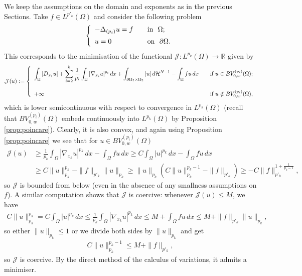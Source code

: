 \documentclass[reqno,12pt]{amsart}
\numberwithin{equation}{section}
\begin{document}
We keep the assumptions on the domain and exponents as in the previous Sections. Take $f \in L^{p'_k}(\Omega)$ and consider the following problem
\begin{equation}\label{eq:ellipticproblem}
\left\{ \begin{array}{lll} -\Delta_{(p_i)} u = f   \quad &\hbox{in} \ \ \Omega; \\[5pt] u = 0 \quad &\hbox{on} \ \ \partial\Omega.
\end{array} \right.
\end{equation}
This corresponds to the minimisation of the functional $\mathcal{J}: L^{p_k}(\Omega) \rightarrow \mathbb{R}$ given by
\begin{equation}
\mathcal{J}(u):= \left\{ \begin{array}{ll} \displaystyle 
\int_{\Omega} |D_{x_1} u| + \sum_{i=2}^k \frac{1}{p_i} \int_{\Omega} |\nabla_{x_i} u|^{p_i} \, dx + \int_{\partial\Omega_1 \times \Omega_2} |u| \, d\mathcal{H}^{N-1} - \int_{\Omega} fu \, dx \quad &\hbox{if} \ u \in BV_{0,w}^{(p_i)}(\Omega); \\ \\ + \infty \quad &\hbox{if} \ u \notin  BV_{0,w}^{(p_i)}(\Omega),
\end{array}\right.
\end{equation}
which is lower semicontinuous with respect to convergence in $L^{p_k}(\Omega)$ (recall that $BV_{0,w}^{(p_i)}(\Omega)$ embeds continuously into $L^{p_k}(\Omega)$ by Proposition \ref{prop:poincare}). Clearly, it is also convex, and again using Proposition \ref{prop:poincare} we see that for $u \in BV_{0,w}^{(p_i)}(\Omega)$
\begin{align}
\mathcal{J}(u) &\geq \frac{1}{p_k} \int_{\Omega} |\nabla_{x_k} u|^{p_k} \, dx - \int_{\Omega} fu \, dx \geq C \int_{\Omega} |u|^{p_k} \, dx - \int_{\Omega} fu \, dx \\
&\geq C \| u \|_{p_k}^{p_k} - \| f \|_{p'_k} \| u \|_{p_k} \geq \| u \|_{p_k} (C \| u \|_{p_k}^{p_k - 1} - \| f \|_{p'_k}) \geq - C \| f \|_{p'_k}^{1 + \frac{1}{p_k - 1}},
\end{align}
so $\mathcal{J}$ is bounded from below (even in the absence of any smallness assumptions on $f$). A similar computation shows that $\mathcal{J}$ is coercive: whenever $\mathcal{J}(u) \leq M$, we have
\begin{align}
C \| u \|_{p_k}^{p_k} = C \int_{\Omega} |u|^{p_k} \, dx \leq \frac{1}{p_k} \int_{\Omega} |\nabla_{x_k} u|^{p_k} \, dx \leq M + \int_{\Omega} fu \, dx \leq M + \| f \|_{p'_k} \| u \|_{p_k},
\end{align}
so either $\| u \|_{p_k} \leq 1$ or we divide both sides by $\| u \|_{p_k}$ and get
\begin{align}
C \| u \|_{p_k}^{p_k - 1} \leq M + \| f \|_{p'_k},
\end{align}
so $\mathcal{J}$ is coercive. By the direct method of the calculus of variations, it admits a minimiser.
\end{document}
